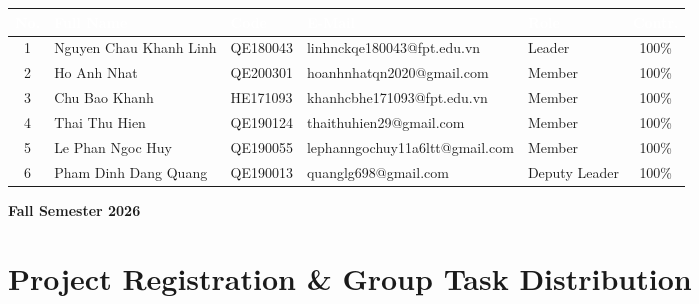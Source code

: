 \documentclass[12pt,a4paper,oneside]{report}
\begin{document}
\begin{titlepage}
    \begin{table}[H]
    \centering
    \small
    \begin{tabular}{|c|p{3.9cm}|p{2.0cm}|p{4.6cm}|p{2.3cm}|c|}
        \hline
        \rowcolor{PrimaryBrown}
        \textcolor{white}{\textbf{No.}} & \textcolor{white}{\textbf{Full Name}} & \textcolor{white}{\textbf{Code}} & \textcolor{white}{\textbf{E-Mail}} & \textcolor{white}{\textbf{Role}} & \textcolor{white}{\textbf{Contr.}} \\
        \hline
        1 & Nguyen Chau Khanh Linh & QE180043 & linhnckqe180043@fpt.edu.vn & Leader & 100\% \\
        \hline
        2 & Ho Anh Nhat & QE200301 & hoanhnhatqn2020@gmail.com & Member & 100\% \\
        \hline
        3 & Chu Bao Khanh & HE171093 & khanhcbhe171093@fpt.edu.vn & Member & 100\% \\
        \hline
        4 & Thai Thu Hien & QE190124 & thaithuhien29@gmail.com & Member & 100\% \\
        \hline
        5 & Le Phan Ngoc Huy & QE190055 & lephanngochuy11a6ltt@gmail.com & Member & 100\% \\
        \hline
        6 & Pham Dinh Dang Quang & QE190013 & quanglg698@gmail.com & Deputy Leader & 100\% \\
        \hline
    \end{tabular}
    \end{table}

    \vfill
    {\large \textbf{Fall Semester 2026}}
\end{titlepage}

\tableofcontents
\newpage
\listoftables
\newpage

\setcounter{page}{1}

\chapter{Project Registration \& Group Task Distribution}
\end{document}
